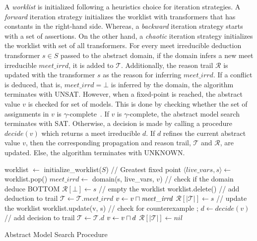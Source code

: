 A {\em worklist} is initialized following a heuristics choice for iteration 
strategies. A {\em forward} iteration strategy initializes the worklist with 
transformers that has constants in the right-hand side. Whereas, a {\em backward} 
iteration strategy starts with a set of assertions. On the other hand, a 
{\em chaotic} iteration strategy initializes the worklist with set of all 
transformers.  For every meet irreducible deduction transformer $s \in S$ 
passed to the abstract domain, if the domain infers a new meet irreducible 
$\mathit{meet\_irrd}$, it is added to $\mathcal{T}$.  Additionally, the reason 
trail $\mathcal{R}$ is updated with the transformer $s$ as the reason for inferring
$\mathit{meet\_irrd}$. If a conflict is deduced, that is, $\mathit{meet\_irrd} = \bot$ 
is inferred by the domain, the algorithm terminates with UNSAT.  However,
when a fixed-point is reached, the abstract value $v$ is checked for set of
models.  This is done by checking whether the set of assignments in $v$ is 
$\gamma$-complete~\cite{gamma}.  If $v$ is $\gamma$-complete, the abstract model 
search terminates with SAT.  Otherwise, a decision is made by calling a 
procedure $decide(v)$ which returns a meet irreducible $d$.  If $d$ refines the 
current abstract value $v$, then the corresponding propagation and reason trail,
$\mathcal{T}$ and $\mathcal{R}$, are updated. Else, the algorithm terminates
with UNKNOWN.      
%    
\begin{algorithm2e}[t]
\DontPrintSemicolon
{}
\begin{small}
worklist $\leftarrow$ initialize\_worklist($S$) \;
\Loop{}
{
// Greatest fixed point \;
{
  $\langle live\_vars, s \rangle \leftarrow$ worklist.pop() \;
  $\mathit{meet\_irrd} \leftarrow$ domain(s, live\_vars, $v$)\;
  // check if the domain deduce BOTTOM \;
   {
    $\mathcal{R}[\bot] \leftarrow s$ \;
    // empty the worklist \;
    worklist.delete() \;
    \return \sat \;
  }
  \uElse
  {
    // add deduction to trail \;
    $\mathcal{T} \leftarrow \mathcal{T} . \mathit{meet\_irrd}$ \; 
    $v \leftarrow v \sqcap \mathit{meet\_irrd}$ \; 
    $\mathcal{R}[|\mathcal{T}|] \leftarrow s$ \;
    // update the worklist \;
    worklist.update(v, s) \; 
  }
}
// check for counterexample\;
 {
  \return \unsat;
}
$d \leftarrow decide(v)$ \;
 {
\return \unknown \;
}
// add decision to trail\;
$\mathcal{T} \leftarrow \mathcal{T} . d$ \; 
$v \leftarrow v \sqcap d$ \; 
$\mathcal{R}[|\mathcal{T}|] \leftarrow nil$ \;
}
\end{small}
\caption{Abstract Model Search Procedure\label{Alg:ms}}
\end{algorithm2e}
%
